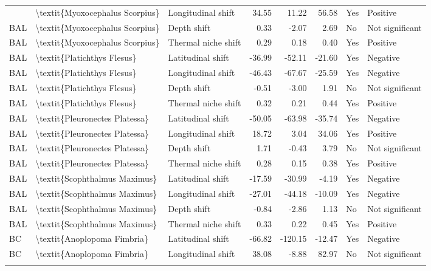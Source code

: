 \begin{longtable}[t]{lllrrrll}
{{BAL & \textbackslash{}textit\{Myoxocephalus Scorpius\} & Longitudinal shift & 34.55 & 11.22 & 56.58 & Yes & Positive\\
BAL & \textbackslash{}textit\{Myoxocephalus Scorpius\} & Depth shift & 0.33 & -2.07 & 2.69 & No & Not significant\\
BAL & \textbackslash{}textit\{Myoxocephalus Scorpius\} & Thermal niche shift & 0.29 & 0.18 & 0.40 & Yes & Positive\\
\addlinespace
BAL & \textbackslash{}textit\{Platichthys Flesus\} & Latitudinal shift & -36.99 & -52.11 & -21.60 & Yes & Negative\\
BAL & \textbackslash{}textit\{Platichthys Flesus\} & Longitudinal shift & -46.43 & -67.67 & -25.59 & Yes & Negative\\
BAL & \textbackslash{}textit\{Platichthys Flesus\} & Depth shift & -0.51 & -3.00 & 1.91 & No & Not significant\\
BAL & \textbackslash{}textit\{Platichthys Flesus\} & Thermal niche shift & 0.32 & 0.21 & 0.44 & Yes & Positive\\
BAL & \textbackslash{}textit\{Pleuronectes Platessa\} & Latitudinal shift & -50.05 & -63.98 & -35.74 & Yes & Negative\\
\addlinespace
BAL & \textbackslash{}textit\{Pleuronectes Platessa\} & Longitudinal shift & 18.72 & 3.04 & 34.06 & Yes & Positive\\
BAL & \textbackslash{}textit\{Pleuronectes Platessa\} & Depth shift & 1.71 & -0.43 & 3.79 & No & Not significant\\
BAL & \textbackslash{}textit\{Pleuronectes Platessa\} & Thermal niche shift & 0.28 & 0.15 & 0.38 & Yes & Positive\\
BAL & \textbackslash{}textit\{Scophthalmus Maximus\} & Latitudinal shift & -17.59 & -30.99 & -4.19 & Yes & Negative\\
BAL & \textbackslash{}textit\{Scophthalmus Maximus\} & Longitudinal shift & -27.01 & -44.18 & -10.09 & Yes & Negative\\
\addlinespace
BAL & \textbackslash{}textit\{Scophthalmus Maximus\} & Depth shift & -0.84 & -2.86 & 1.13 & No & Not significant\\
BAL & \textbackslash{}textit\{Scophthalmus Maximus\} & Thermal niche shift & 0.33 & 0.22 & 0.45 & Yes & Positive\\
BC & \textbackslash{}textit\{Anoplopoma Fimbria\} & Latitudinal shift & -66.82 & -120.15 & -12.47 & Yes & Negative\\
BC & \textbackslash{}textit\{Anoplopoma Fimbria\} & Longitudinal shift & 38.08 & -8.88 & 82.97 & No & Not significant\\
}}
\end{longtable}
